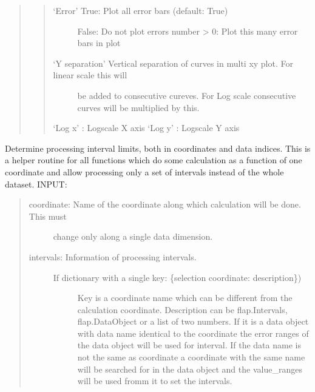 \documentclass[letterpaper,10pt,english]{sphinxmanual}
\begin{document}
\begin{fulllineitems}
\begin{fulllineitems}
\begin{quote}
\begin{quote}
\begin{description}
\item[{‘Error’      True: Plot all error bars (default: True)}] \leavevmode
False: Do not plot errors
number \textgreater{} 0: Plot this many error bars in plot

\item[{‘Y separation’ Vertical separation of curves in multi xy plot. For linear scale this will}] \leavevmode
be added to consecutive cureves. For Log scale consecutive curves will be
multiplied by this.

\end{description}

‘Log x’ : Logscale X axis
‘Log y’ : Logscale Y axis
\end{quote}
\end{quote}

\end{fulllineitems}


\begin{fulllineitems}
\label{\detokenize{data_object:flap.data_object.DataObject.proc_interval_limits}}
Determine processing interval limits, both in coordinates and data indices.
This is a helper routine for all functions which do some calculation as a function
of one coordinate and allow processing only a set of intervals instead of the whole dataset.
INPUT:
\begin{quote}
\begin{description}
\item[{coordinate: Name of the coordinate along which calculation will be done. This must}] \leavevmode
change only along a single data dimension.

\item[{intervals: Information of processing intervals.}] \leavevmode\begin{description}
\item[{If dictionary with a single key: \{selection coordinate: description\})}] \leavevmode
Key is a coordinate name which can be different from the calculation
coordinate.
Description can be flap.Intervals, flap.DataObject or
a list of two numbers. If it is a data object with data name identical to
the coordinate the error ranges of the data object will be used for
interval. If the data name is not the same as coordinate a coordinate with the
same name will be searched for in the data object and the value\_ranges
will be used fromm it to set the intervals.


\end{description}
\end{description}
\end{quote}
\end{fulllineitems}
\end{fulllineitems}
\end{document}
